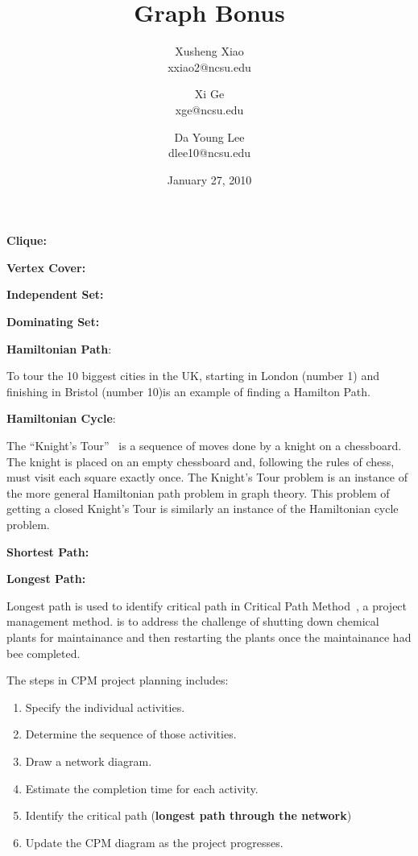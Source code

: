 \documentclass[article, 10pt,onecolumn]{article}
\title{Graph Bonus}
\author{
Xusheng Xiao\\
\small{xxiao2@ncsu.edu}\\
\and
Xi Ge\\
\small{xge@ncsu.edu}\\
\and
Da Young Lee\\
\small{dlee10@ncsu.edu}
}
\date{January 27, 2010}
\begin{document}
\maketitle

\begin{flushleft}
\textbf{Clique:}\end{flushleft} 

\begin{flushleft}
\textbf{Vertex Cover:}\end{flushleft} 

\begin{flushleft}
\textbf{Independent Set:}\end{flushleft} 

\begin{flushleft}
\textbf{Dominating Set:}\end{flushleft} 

\begin{flushleft}
\textbf{Hamiltonian Path}:\end{flushleft} To tour the 10 biggest cities in the UK, starting in London (number 1) and finishing in Bristol (number 10)is an example of finding a Hamilton Path.~\cite{path}

\begin{flushleft}
\textbf{Hamiltonian Cycle}:\end{flushleft} The ``Knight's Tour''~\cite{knight} is a sequence of moves done by a knight on a chessboard. The knight is placed on an empty chessboard and, following the rules of chess, must visit each square exactly once. The Knight's Tour problem is an instance of the more general Hamiltonian path problem in graph theory. This problem of getting a closed Knight's Tour is similarly an instance of the Hamiltonian cycle problem.

\begin{flushleft}
\textbf{Shortest Path:}\end{flushleft}

\begin{flushleft}
\textbf{Longest Path:}\end{flushleft} Longest path is used to identify critical path in Critical Path Method~\cite{cpm}, a project management method.  is to address the challenge of shutting down chemical plants for maintainance and then restarting the plants once the maintainance had bee completed. 

The steps in CPM project planning includes: 
\begin{enumerate}
	\item Specify the individual activities.
	\item Determine the sequence of those activities.
	\item Draw a network diagram.
	\item Estimate the completion time for each activity.
	\item Identify the critical path (\textbf{longest path through the network})
	\item Update the CPM diagram as the project progresses.
\end{enumerate}
\end{document}
